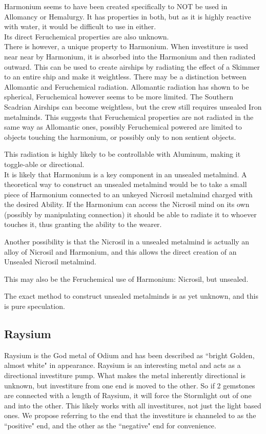 \documentclass[conference]{IEEEtran}
\begin{document}
Harmonium seems to have been created specifically to NOT be used in Allomancy or Hemalurgy.  It has properties in both\cite{FEH+}, but as it is highly reactive with water,\cite{BoM-CH22} it would be difficult to use in either.\\

Its direct Feruchemical properties are also unknown.\\

There is however, a unique property to Harmonium.  When investiture is used near near by Harmonium, it is absorbed into the Harmonium and then radiated outward.\cite{BoM-CH17}  This can be used to create airships by radiating the effect of a Skimmer to an entire ship and make it weightless.\cite{BoM-CH21}  There may be a distinction between Allomantic and Feruchemical radiation.  Allomantic radiation has shown to be spherical,\cite{BoM-CH17} Feruchemical however seems to be more limited.  The Southern Scadrian Airships can become weightless, but the crew still requires unsealed Iron metalminds.\cite{BoM-CH21}  This suggests that Feruchemical properties are not radiated in the same way as Allomantic ones, possibly Feruchemical powered are limited to objects touching the harmonium, or possibly only to non sentient objects.

This radiation is highly likely to be controllable with Aluminum, making it toggle-able or directional.\\

It is likely that Harmonium is a key component in an unsealed metalmind.  A theoretical way to construct an unsealed metalmind would be to take a small piece of Harmonium connected to an unkeyed Nicrosil metalmind charged with the desired Ability.  If the Harmonium can access the Nicrosil mind on its own (possibly by manipulating connection) it should be able to radiate it to whoever touches it, thus granting the ability to the wearer. 

Another possibility is that the Nicrosil in a unsealed metalmind is actually an alloy of Nicrosil and Harmonium, and this allows the direct creation of an Unsealed Nicrosil metalmind.

This may also be the Feruchemical use of Harmonium: Nicrosil, but unsealed.

The exact method to construct unsealed metalminds is as yet unknown, and this is pure speculation.  
\subsection*{Raysium\cite{rayse}}
Raysium is the God metal of Odium and has been described as ``bright Golden, almost white" in appearance.\cite{RoW-CH84}  Raysium is an interesting metal and acts as a directional investiture pump.  What makes the metal inherently directional is unknown, but investiture from one end is moved to the other.  So if 2 gemstones are connected with a length of Raysium, it will force the Stormlight out of one and into the other.  This likely works with all investitures, not just the light based ones.\cite{RoW-CH84}  We propose referring to the end that the investiture is channeled to as the ``positive" end, and the other as the ``negative" end for convenience.\\
\end{document}
